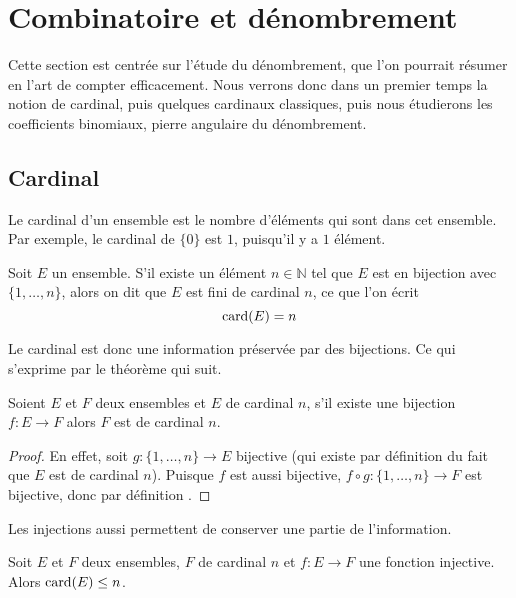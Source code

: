 \section{Combinatoire et dénombrement}

Cette section est centrée sur l'étude du dénombrement, que l'on pourrait résumer en \og l'art de compter efficacement\fg{}. Nous verrons donc dans un premier temps la notion de cardinal, puis quelques cardinaux classiques, puis nous étudierons les coefficients binomiaux, pierre angulaire du dénombrement.

\subsection{Cardinal}

Le cardinal d'un ensemble est le nombre d'éléments qui sont dans cet ensemble. Par exemple, le cardinal de $\{0\}$ est $1$, puisqu'il y a $1$ élément.

\begin{defi}[Cardinal]
    Soit $E$ un ensemble. S'il existe un élément $n\in\mathbb N$ tel que $E$ est en bijection avec $\{1,\ldots,n\}$, alors on dit que $E$ est fini de cardinal $n$, ce que l'on écrit $$\mathrm{card}(E) = n$$
\end{defi}

Le cardinal est donc une information préservée par des bijections. Ce qui s'exprime par le théorème qui suit.

\begin{them}
    Soient $E$ et $F$ deux ensembles et $E$ de cardinal $n$, s'il existe une bijection $f : E \to F$ alors $F$ est de cardinal $n$.
\end{them}

\begin{proof}
    En effet, soit $g : \{1,\ldots,n\}\to E$ bijective (qui existe par définition du fait que $E$ est de cardinal $n$). Puisque $f$ est aussi bijective, $f\circ g : \{1,\ldots,n\}\to F$ est bijective, donc par définition .
\end{proof}

Les injections aussi permettent de conserver une partie de l'information.

\begin{them}
    Soit $E$ et $F$ deux ensembles, $F$ de cardinal $n$ et $f : E \to F$ une fonction injective. Alors $\mathrm{card}(E) \leq n$.
\end{them}

